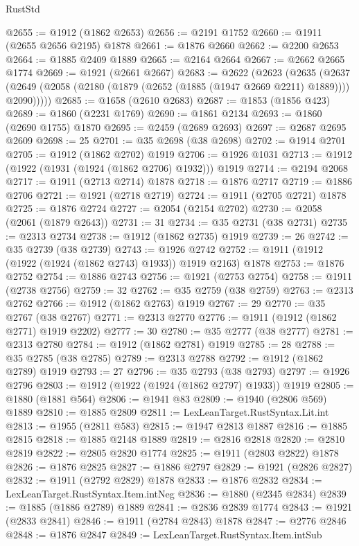 \begin{lexlean}{RustStd}
\begin{coremodule}
{\begin{coremodule}
{{{{{{{{{{{{{{{{{{{{{{{{{{{{{@2655 := @1912 (@1862 @2653)
@2656 := @2191 @1752
@2660 := @1911 (@2655 @2656 @2195) @1878
@2661 := @1876 @2660
@2662 := @2200 @2653
@2664 := @1885 @2409 @1889
@2665 := @2164 @2664
@2667 := @2662 @2665 @1774
@2669 := @1921 (@2661 @2667)
@2683 := @2622
    (@2623
      (@2635
        (@2637 (@2649 (@2058 (@2180 (@1879 (@2652 (@1885 (@1947 @2669 @2211) @1889)))) @2090)))))
@2685 := @1658 (@2610 @2683)
@2687 := @1853 (@1856 @423)
@2689 := @1860 (@2231 @1769)
@2690 := @1861 @2134
@2693 := @1860 (@2690 @1755) @1870
@2695 := @2459 (@2689 @2693)
@2697 := @2687 @2695 @2609
@2698 := 25
@2701 := @35 @2698 (@38 @2698)
@2702 := @1914 @2701
@2705 := @1912 (@1862 @2702) @1919
@2706 := @1926 @1031
@2713 := @1912 (@1922 (@1931 (@1924 (@1862 @2706) @1932))) @1919
@2714 := @2194 @2068
@2717 := @1911 (@2713 @2714) @1878
@2718 := @1876 @2717
@2719 := @1886 @2706
@2721 := @1921 (@2718 @2719)
@2724 := @1911 (@2705 @2721) @1878
@2725 := @1876 @2724
@2727 := @2054 (@2154 @2702)
@2730 := @2058 (@2061 (@1879 @2643))
@2731 := 31
@2734 := @35 @2731 (@38 @2731)
@2735 := @2313 @2734
@2738 := @1912 (@1862 @2735) @1919
@2739 := 26
@2742 := @35 @2739 (@38 @2739)
@2743 := @1926 @2742
@2752 := @1911 (@1912 (@1922 (@1924 (@1862 @2743) @1933)) @1919 @2163) @1878
@2753 := @1876 @2752
@2754 := @1886 @2743
@2756 := @1921 (@2753 @2754)
@2758 := @1911 (@2738 @2756)
@2759 := 32
@2762 := @35 @2759 (@38 @2759)
@2763 := @2313 @2762
@2766 := @1912 (@1862 @2763) @1919
@2767 := 29
@2770 := @35 @2767 (@38 @2767)
@2771 := @2313 @2770
@2776 := @1911 (@1912 (@1862 @2771) @1919 @2202)
@2777 := 30
@2780 := @35 @2777 (@38 @2777)
@2781 := @2313 @2780
@2784 := @1912 (@1862 @2781) @1919
@2785 := 28
@2788 := @35 @2785 (@38 @2785)
@2789 := @2313 @2788
@2792 := @1912 (@1862 @2789) @1919
@2793 := 27
@2796 := @35 @2793 (@38 @2793)
@2797 := @1926 @2796
@2803 := @1912 (@1922 (@1924 (@1862 @2797) @1933)) @1919
@2805 := @1880 (@1881 @564)
@2806 := @1941 @83
@2809 := @1940 (@2806 @569) @1889
@2810 := @1885 @2809
@2811 := LexLeanTarget.RustSyntax.Lit.int
@2813 := @1955 (@2811 @583)
@2815 := @1947 @2813 @1887
@2816 := @1885 @2815
@2818 := @1885 @2148 @1889
@2819 := @2816 @2818
@2820 := @2810 @2819
@2822 := @2805 @2820 @1774
@2825 := @1911 (@2803 @2822) @1878
@2826 := @1876 @2825
@2827 := @1886 @2797
@2829 := @1921 (@2826 @2827)
@2832 := @1911 (@2792 @2829) @1878
@2833 := @1876 @2832
@2834 := LexLeanTarget.RustSyntax.Item.intNeg
@2836 := @1880 (@2345 @2834)
@2839 := @1885 (@1886 @2789) @1889
@2841 := @2836 @2839 @1774
@2843 := @1921 (@2833 @2841)
@2846 := @1911 (@2784 @2843) @1878
@2847 := @2776 @2846
@2848 := @1876 @2847
@2849 := LexLeanTarget.RustSyntax.Item.intSub
}}}}}}}}}}}}}}}}}}}}}}}}}}}}}
\end{coremodule}}
\end{coremodule}
\end{lexlean}
